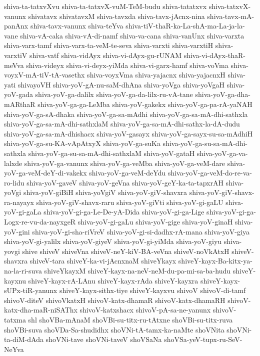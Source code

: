{shiva-ta-tatxvXvu
shiva-ta-tatxvX-vuM-TeM-budu
shiva-tatatxvx
shiva-tatxvX-vanunx
shivatavx
shivatavxM
shiva-tavxda
shiva-tavx-jAcnx-nina
shiva-tavx-mA-panAnx
shiva-tavx-vanunx
shiva-teYva
shiva-tiV-thaR-ka-La-shA-ma-La-ja-la-vane
shiva-vA-caka
shiva-vA-di-namf
shiva-va-cana
shiva-vanUnx
shiva-varxta
shiva-varx-tamf
shiva-varx-ta-veM-te-seva
shiva-varxti
shiva-varxtiH
shiva-varxtiV
shiva-vatf
shiva-vidAyx
shiva-vi-dAyx-gu-rUNAM
shiva-vi-dAyx-thaR-meVva
shiva-videyx
shiva-vi-deyx-yiMda
shiva-vi-garx-hamf
shiva-voVma
shiva-voyxV-mA-tiV-tA-vasethx
shiva-voyxVma
shiva-yajacnx
shiva-yajacnxH
shiva-yati
shivayoVH
shiva-yoV-gA-nu-saM-dhAna
shiva-yoVga
shiva-yoVgaH
shiva-yoV-gada
shiva-yoV-ga-dalilx
shiva-yoV-ga-da-lilx-ru-vA-tane
shiva-yoV-ga-dha-mARthaR
shiva-yoV-ga-ga-LeMba
shiva-yoV-gakekx
shiva-yoV-ga-pa-rA-yaNAH
shiva-yoV-ga-sA-dhaka
shiva-yoV-ga-sa-mAdhi
shiva-yoV-ga-sa-mA-dhi-sathxla
shiva-yoV-ga-sa-mA-dhi-sathxlaM
shiva-yoV-ga-sa-mA-dhi-sathx-la-dA-dudu
shiva-yoV-ga-sa-mA-dhishacx
shiva-yoV-gasayx
shiva-yoV-ga-sayx-su-sa-mAdhiH
shiva-yoV-ga-su-KA-vApAtxyX
shiva-yoV-ga-suKa
shiva-yoV-ga-su-sa-mA-dhi-sathxla
shiva-yoV-ga-su-sa-mA-dhi-sathxlaM
shiva-yoV-gataH
shiva-yoV-ga-va-lalxde
shiva-yoV-ga-vanunx
shiva-yoV-ga-veMba
shiva-yoV-ga-veM-dare
shiva-yoV-ga-veM-deY-di-vakekx
shiva-yoV-ga-veM-deYdu
shiva-yoV-ga-veM-do-re-va-ro-lidu
shiva-yoV-gaveV
shiva-yoV-geVna
shiva-yoV-geY-ka-ta-tapxrAH
shiva-yoVgi
shiva-yoV-giBiH
shiva-yoVgiV
shiva-yoV-giV-shavxra
shiva-yoV-giV-shavx-ra-nayayx
shiva-yoV-giV-shavx-raru
shiva-yoV-giVti
shiva-yoV-gi-gaLU
shiva-yoV-gi-gaLa
shiva-yoV-gi-ga-Le-De-yA-Dida
shiva-yoV-gi-ga-Lige
shiva-yoV-gi-ga-Logx-re-vu-da-nayxgeR
shiva-yoV-gi-gaLu
shiva-yoV-gige
shiva-yoV-ginaH
shiva-yoV-gini
shiva-yoV-gi-sha-riVreV
shiva-yoV-gi-si-dadhx-rA-mana
shiva-yoV-giya
shiva-yoV-gi-yalilx
shiva-yoV-giyeV
shiva-yoV-gi-yiMda
shiva-yoV-giyu
shiva-yovgi
shive
shiveV
shiveVna
shiveV-neY-kiV-BA-veVna
shiveV-noVkAtxH
shiveV-shavxra
shiveV-tara
shiveY-ka-vi-jAcnxnaM
shiveYkayx
shiveY-kayx-Ba-kitx-ya-na-la-ri-suva
shiveYkayxM
shiveY-kayx-na-neV-neM-du-pa-mi-sa-ba-hudu
shiveY-kayxnu
shiveY-kayx-rA-LAnu
shiveY-kayx-rAda
shiveY-kayxra
shiveY-kayx-sUPx-tiR-yanunx
shiveY-kayx-sithx-tiye
shiveY-kayxvu
shivoV
shivoV-di-tamf
shivoV-diteV
shivoVkatxH
shivoV-katx-dhamaR
shivoV-katx-dhamaRH
shivoV-katx-dha-maR-niSAThx
shivoV-katxshacx
shivoV-pA-sa-ne-yanunx
shivoV-tatxma
shl
shoVBa-mAnaM
shoVBi-su-titx-ru-tAtxne
shoVBi-su-titx-ruva
shoVBi-suva
shoVDa-Sa-shudidhx
shoVNi-tA-tamx-ka-naMte
shoVNita
shoVNi-ta-diM-dAda
shoVNi-tave
shoVNi-taveV
shoVSaNa
shoVSa-yeV-tupx-ru-SeV-NeYva
}
